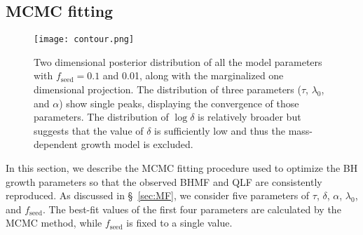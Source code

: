 \documentclass[twocolumn, twocolappendix]{aastex63}
\newcommand{\tlife}{\tau}
\newcommand{\fseed}{f_\mathrm{seed}}
\begin{document}
\begin{CJK*}{UTF8}{gbsn}
\vspace{2mm}
\subsection{MCMC fitting}\label{sec:fitting}

\begin{figure*}
\centering
\texttt{[image: contour.png]} %
\caption{
Two dimensional posterior distribution of all the model parameters with $\fseed=0.1$ and 0.01, 
along with the marginalized one dimensional projection.
The distribution of three parameters ($\tau$, $\lambda_0$, and $\alpha$) show single peaks,
displaying the convergence of those parameters.
The distribution of $\log\delta$ is relatively broader but suggests that the value of $\delta$
is sufficiently low and thus the mass-dependent growth model is excluded.
}
\label{fig:contour}
\vspace{5mm}
\end{figure*}
%


In this section, we describe the MCMC fitting procedure used to optimize 
the BH growth parameters so that the observed BHMF and QLF are consistently reproduced. 
As discussed in \S~\ref{sec:MF}, we consider five parameters of $\tlife$, $\delta$, $\alpha$, $\lambda_0$, and $\fseed$.
The best-fit values of the first four parameters are calculated by the MCMC method, while $\fseed$ is fixed to a single value.


\end{CJK*}
\end{document}
